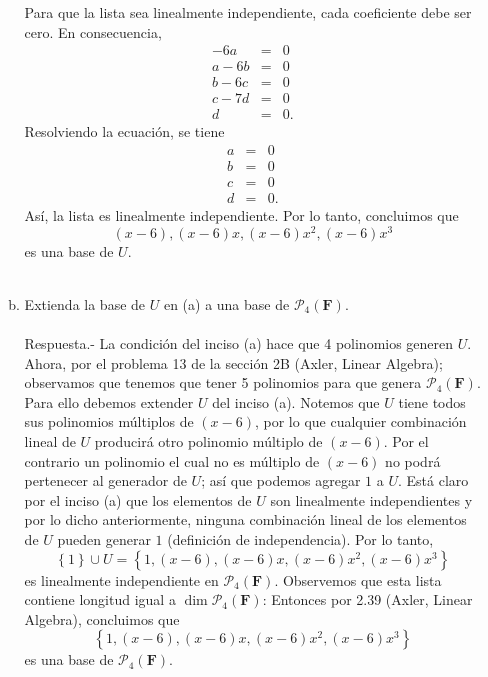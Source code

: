 \begin{enumerate}[\bfseries 1.]
\begin{enumerate}[(a)]
		Para que la lista sea linealmente independiente, cada coeficiente debe ser cero. En consecuencia,
		$$
		\begin{array}{rcl}
		    -6a&=&0\\
		    a-6b&=&0\\
		    b-6c&=&0\\
		    c-7d&=&0\\
		    d&=&0.
		\end{array}
		$$
		Resolviendo la ecuación, se tiene
		$$
		\begin{array}{rcl}
		    a&=&0\\
		    b&=&0\\
		    c&=&0\\
		    d&=&0.
		\end{array}
		$$
		Así, la lista es linealmente independiente. Por lo tanto, concluimos que 
		$$(x-6),(x-6)x,(x-6)x^2,(x-6)x^3$$
		es una base de $U$.\\\\

	    \item Extienda la base de $U$ en (a) a una base de $\mathcal{P}_4(\textbf{F})$.\\\\
		Respuesta.-\; La condición del inciso (a) hace que 4 polinomios generen $U$. Ahora, por el problema 13 de la sección 2B (Axler, Linear Algebra); observamos que tenemos que tener 5 polinomios para que genera $\mathcal{P}_4(\textbf{F})$. Para ello debemos extender $U$ del inciso (a). Notemos que $U$ tiene todos sus polinomios múltiplos de $(x-6)$, por lo que cualquier combinación lineal de $U$ producirá otro polinomio múltiplo de $(x-6)$. Por el contrario un polinomio el cual no es múltiplo de $(x-6)$ no podrá pertenecer al generador de $U$; así que podemos agregar $1$  a $U$. Está claro por el inciso (a) que los elementos de $U$ son linealmente independientes y por lo dicho anteriormente, ninguna combinación lineal de los elementos de $U$ pueden generar $1$ (definición de independencia). Por lo tanto, 
		$$\left\{1\right\}\cup U = \left\{1,(x-6),(x-6)x,(x-6)x^2,(x-6)x^3\right\}$$
		es linealmente independiente en $\mathcal{P}_4(\textbf{F})$. Observemos que esta lista contiene longitud igual a $\dim \mathcal{P}_4(\textbf{F})$: Entonces por 2.39 (Axler, Linear Algebra), concluimos que 
		$$\left\{1,(x-6),(x-6)x,(x-6)x^2,(x-6)x^3\right\}$$ 
		es una base de $\mathcal{P}_4(\textbf{F})$.\\\\



\end{enumerate}
\end{enumerate}
